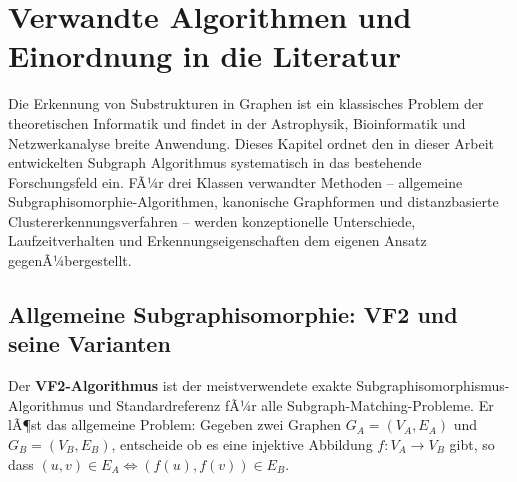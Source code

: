 ﻿\documentclass[a4paper,12pt]{report}
\theoremstyle{definition}
\begin{document}
\chapter{Verwandte Algorithmen und Einordnung in die Literatur}
\label{chap:related}

Die Erkennung von Substrukturen in Graphen ist ein klassisches Problem der theoretischen Informatik und findet in der Astrophysik, Bioinformatik und Netzwerkanalyse breite Anwendung. Dieses Kapitel ordnet den in dieser Arbeit entwickelten Subgraph Algorithmus systematisch in das bestehende Forschungsfeld ein. FÃ¼r drei Klassen verwandter Methoden -- allgemeine Subgraphisomorphie-Algorithmen, kanonische Graphformen und distanzbasierte Clustererkennungsverfahren -- werden konzeptionelle Unterschiede, Laufzeitverhalten und Erkennungseigenschaften dem eigenen Ansatz gegenÃ¼bergestellt.

\section{Allgemeine Subgraphisomorphie: VF2 und seine Varianten}
\label{sec:related_vf2}

Der \textbf{VF2-Algorithmus} \cite{cordella2004} ist der meistverwendete exakte Subgraphisomorphismus-Algorithmus und Standardreferenz fÃ¼r alle Subgraph-Matching-Probleme. Er lÃ¶st das allgemeine Problem: Gegeben zwei Graphen $G_A = (V_A, E_A)$ und $G_B = (V_B, E_B)$, entscheide ob es eine injektive Abbildung $f: V_A \to V_B$ gibt, so dass $(u,v) \in E_A \Leftrightarrow (f(u), f(v)) \in E_B$.
\end{document}
